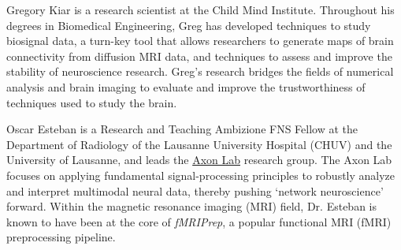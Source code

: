 \documentclass[lettersize,journal]{IEEEtran}
\begin{document}
{\begin{IEEEbiography}{Gregory Kiar} is a research scientist at the Child Mind Institute. Throughout his
  degrees in Biomedical Engineering, Greg has developed techniques to study
  biosignal data, a turn-key tool that allows researchers to generate maps of
  brain connectivity from diffusion MRI data, and techniques to assess and
  improve the stability of neuroscience research. Greg’s research bridges
  the fields of numerical analysis and brain imaging to evaluate and improve
  the trustworthiness of techniques used to study the brain.
\end{IEEEbiography}

\begin{IEEEbiography}{Oscar Esteban}
  is a Research and Teaching Ambizione FNS Fellow at the Department of Radiology of the Lausanne University Hospital (CHUV) and the University of Lausanne, and leads the \href{https://www.axonlab.org}{Axon Lab} research group.
  The Axon Lab focuses on applying fundamental signal-processing principles to robustly analyze and interpret multimodal neural data, thereby pushing `network neuroscience' forward.
Within the magnetic resonance imaging (MRI) field, Dr. Esteban is known to have been at the core of \textit{fMRIPrep},
  a popular functional MRI (fMRI) preprocessing pipeline.
\end{IEEEbiography}

}
\end{document}
